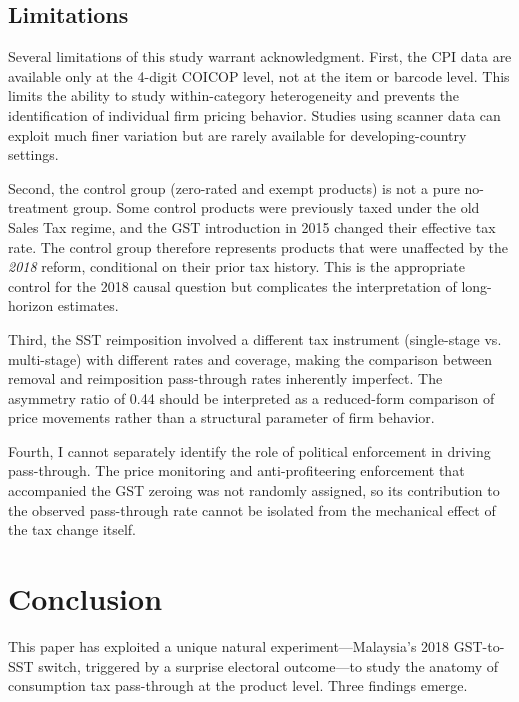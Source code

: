 \documentclass[12pt]{article}
\begin{document}
\subsection{Limitations}

Several limitations of this study warrant acknowledgment. First, the CPI data are available only at the 4-digit COICOP level, not at the item or barcode level. This limits the ability to study within-category heterogeneity and prevents the identification of individual firm pricing behavior. Studies using scanner data \citep{berardi2015} can exploit much finer variation but are rarely available for developing-country settings.

Second, the control group (zero-rated and exempt products) is not a pure no-treatment group. Some control products were previously taxed under the old Sales Tax regime, and the GST introduction in 2015 changed their effective tax rate. The control group therefore represents products that were unaffected by the \emph{2018} reform, conditional on their prior tax history. This is the appropriate control for the 2018 causal question but complicates the interpretation of long-horizon estimates.

Third, the SST reimposition involved a different tax instrument (single-stage vs. multi-stage) with different rates and coverage, making the comparison between removal and reimposition pass-through rates inherently imperfect. The asymmetry ratio of 0.44 should be interpreted as a reduced-form comparison of price movements rather than a structural parameter of firm behavior.

Fourth, I cannot separately identify the role of political enforcement in driving pass-through. The price monitoring and anti-profiteering enforcement that accompanied the GST zeroing was not randomly assigned, so its contribution to the observed pass-through rate cannot be isolated from the mechanical effect of the tax change itself.


\section{Conclusion}

This paper has exploited a unique natural experiment---Malaysia's 2018 GST-to-SST switch, triggered by a surprise electoral outcome---to study the anatomy of consumption tax pass-through at the product level. Three findings emerge.
\end{document}
